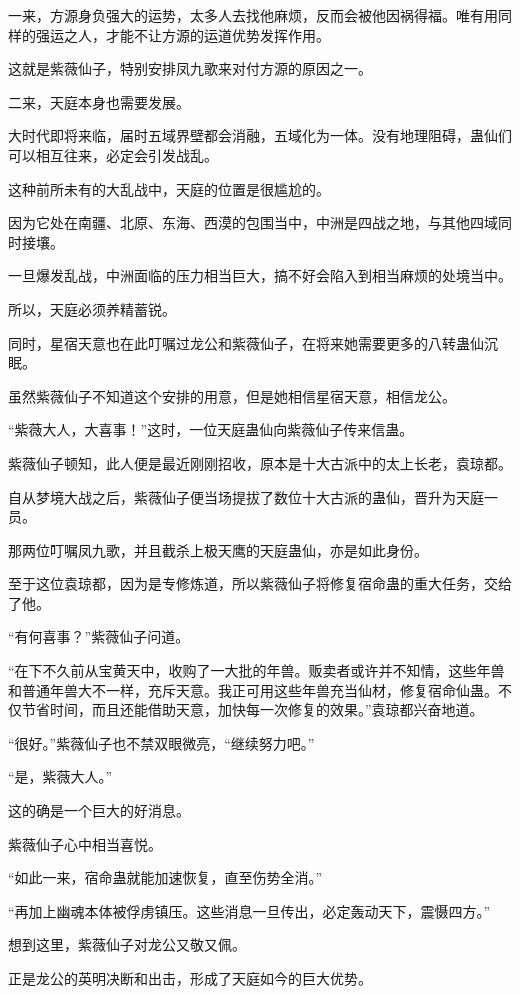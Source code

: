 \begin{this_body}
一来，方源身负强大的运势，太多人去找他麻烦，反而会被他因祸得福。唯有用同样的强运之人，才能不让方源的运道优势发挥作用。

这就是紫薇仙子，特别安排凤九歌来对付方源的原因之一。

二来，天庭本身也需要发展。

大时代即将来临，届时五域界壁都会消融，五域化为一体。没有地理阻碍，蛊仙们可以相互往来，必定会引发战乱。

这种前所未有的大乱战中，天庭的位置是很尴尬的。

因为它处在南疆、北原、东海、西漠的包围当中，中洲是四战之地，与其他四域同时接壤。

一旦爆发乱战，中洲面临的压力相当巨大，搞不好会陷入到相当麻烦的处境当中。

所以，天庭必须养精蓄锐。

同时，星宿天意也在此叮嘱过龙公和紫薇仙子，在将来她需要更多的八转蛊仙沉眠。

虽然紫薇仙子不知道这个安排的用意，但是她相信星宿天意，相信龙公。

“紫薇大人，大喜事！”这时，一位天庭蛊仙向紫薇仙子传来信蛊。

紫薇仙子顿知，此人便是最近刚刚招收，原本是十大古派中的太上长老，袁琼都。

自从梦境大战之后，紫薇仙子便当场提拔了数位十大古派的蛊仙，晋升为天庭一员。

那两位叮嘱凤九歌，并且截杀上极天鹰的天庭蛊仙，亦是如此身份。

至于这位袁琼都，因为是专修炼道，所以紫薇仙子将修复宿命蛊的重大任务，交给了他。

“有何喜事？”紫薇仙子问道。

“在下不久前从宝黄天中，收购了一大批的年兽。贩卖者或许并不知情，这些年兽和普通年兽大不一样，充斥天意。我正可用这些年兽充当仙材，修复宿命仙蛊。不仅节省时间，而且还能借助天意，加快每一次修复的效果。”袁琼都兴奋地道。

“很好。”紫薇仙子也不禁双眼微亮，“继续努力吧。”

“是，紫薇大人。”

这的确是一个巨大的好消息。

紫薇仙子心中相当喜悦。

“如此一来，宿命蛊就能加速恢复，直至伤势全消。”

“再加上幽魂本体被俘虏镇压。这些消息一旦传出，必定轰动天下，震慑四方。”

想到这里，紫薇仙子对龙公又敬又佩。

正是龙公的英明决断和出击，形成了天庭如今的巨大优势。


\end{this_body}
